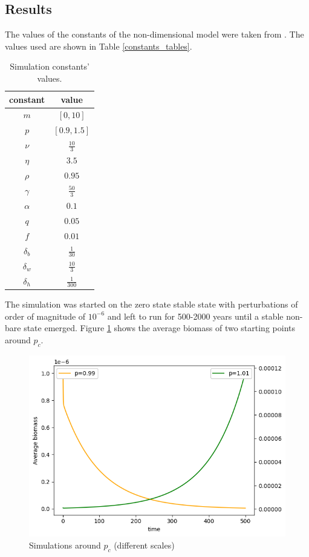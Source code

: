 \documentclass{article}
\numberwithin{equation}{section}
\begin{document}
\subsection{Results}
The values of the constants of the non-dimensional model were taken from \parencite[]{gilad_mathematical_2007}. The values used are shown in Table  \ref{constants_tables}.
\begin{table}[!h]
\centering
    \begin{tabular}{||cc||}
    \hline
        constant & value \\
         \hline\hline
         $m$ & $[0, 10]$ \\
         $p$ & $[0.9, 1.5]$ \\
         $\nu$ & $\frac{10}{3}$ \\
         $\eta$ & $3.5$ \\
         $\rho$ & $0.95$ \\
         $\gamma$ & $\frac{50}{3}$ \\
         $\alpha$ & $0.1$ \\
         $q$ & $0.05$ \\
         $f$ & $0.01$ \\
         $\delta_b$ & $\frac{1}{30}$ \\
         $\delta_w$ & $\frac{10}{3}$ \\
         $\delta_h$ & $\frac{1}{300}$ \\
    \hline
    \end{tabular}
    \caption{Simulation constants' values.}
    \label{table:constants_tables}
\end{table}

The simulation was started on the zero state stable state with perturbations of order of magnitude of $10^{-6}$ and left to run for 500-2000 years until a stable non-bare state emerged. Figure \ref{fig:critical_point} shows the average biomass of two starting points around $p_c$.
\begin{figure}[!h]
    \centering
    \includegraphics[scale=0.5]{plots/critical point.png}
    \caption{Simulations around $p_c$ (different scales)}
    \label{fig:critical_point}
\end{figure}
\end{document}
